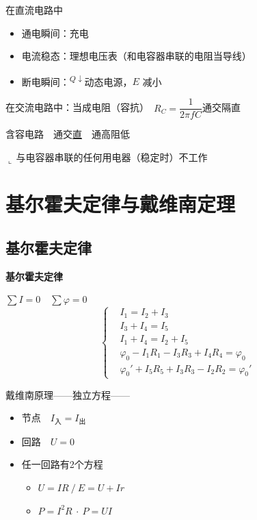 \noindent 在直流电路中
\begin{itemize}
\item 通电瞬间：充电
\item 电流稳态：理想电压表（和电容器串联的电阻当导线）
\item 断电瞬间：\textsuperscript{$Q\downarrow$}动态电源，$E$ 减小
\end{itemize}

\noindent 在交流电路中：当成电阻（容抗）\ $R_C=\dfrac{1}{2\pi fC}$\quad 通交隔直

\noindent 含容电路　通交\underline{直}　通高阻低

\noindent \hspace*{2em}$\llcorner$\,与电容器串联的任何用电器（稳定时）不工作


\section{基尔霍夫定律与戴维南定理}
\subsection{基尔霍夫定律}
\textbf{基尔霍夫定律}

\noindent $\sum I=0$　$\sum\varphi=0$
\[ \left\{\begin{aligned}
&I_1=I_2+I_3\\
&I_3+I_4=I_5\\
&I_1+I_4=I_2+I_5\\
&\varphi_0-I_1R_1-I_3R_3+I_4R_4=\varphi_0\\
&\varphi_0'+I_5R_5+I_3R_3-I_2R_2=\varphi_0'
\end{aligned}\right. \]

\noindent 戴维南原理——独立方程——
\begin{itemize}
\item 节点　$I_{\text{入}}=I_{\text{出}}$
\item 回路　$U=0$
\item 任一回路有2个方程
\begin{itemize}
\item $U=IR\ /\ E=U+Ir$
\item $P=I^2R\ \cdot\ P=UI$
\end{itemize}
\end{itemize}

